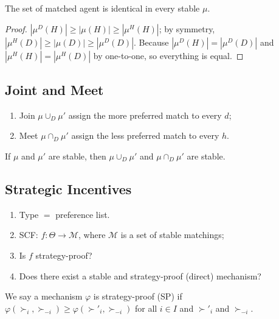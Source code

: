 \documentclass[11pt]{elegantbook}
\begin{document}
\begin{theorem}
    The set of matched agent is identical in every stable $\mu$.
\end{theorem}
\begin{proof}
    $|\mu^D(H)|\geq |\mu(H)|\geq |\mu^H(H)|$; by symmetry, $|\mu^H(D)|\geq |\mu(D)|\geq |\mu^D(D)|$. Because $|\mu^D(H)|=|\mu^D(D)|$ and $|\mu^H(H)|=|\mu^H(D)|$ by one-to-one, so everything is equal.
\end{proof}

\subsection{Joint and Meet}
\begin{definition}
    \normalfont
    \begin{enumerate}
        \item Join $\mu \cup_D \mu'$ assign the more preferred match to every $d$;
        \item Meet $\mu\cap_D\mu'$ assign the less preferred match to every $h$.
    \end{enumerate}
\end{definition}

\begin{theorem}
    If $\mu$ and $\mu'$ are stable, then $\mu\cup_D\mu'$ and $\mu\cap_D\mu'$ are stable.
\end{theorem}

\subsection{Strategic Incentives}
\begin{enumerate}[$\circ$]
    \item Type $=$ preference list.
    \item SCF: $f: \Theta \rightarrow \mathcal{M}$, where $\mathcal{M}$ is a set of stable matchings;
    \item Is $f$ strategy-proof?
    \item Does there exist a stable and strategy-proof (direct) mechanism?
\end{enumerate}

\begin{definition}
    \normalfont
    We say a mechanism $\varphi$ is strategy-proof (SP) if $\varphi(\succ_i,\succ_{-i})\geq \varphi (\succ'_i,\succ_{-i})$ for all $i\in I$ and $\succ'_i$ and $\succ_{-i}$.
\end{definition}
\end{document}
